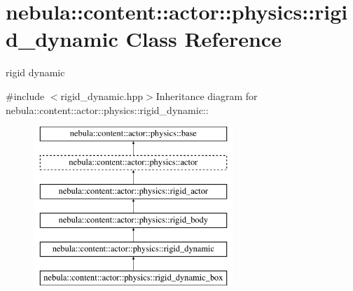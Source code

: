 \hypertarget{classnebula_1_1content_1_1actor_1_1physics_1_1rigid__dynamic}{
\section{nebula::content::actor::physics::rigid\_\-dynamic Class Reference}
\label{classnebula_1_1content_1_1actor_1_1physics_1_1rigid__dynamic}
}


rigid dynamic  


{\ttfamily \#include $<$rigid\_\-dynamic.hpp$>$}Inheritance diagram for nebula::content::actor::physics::rigid\_\-dynamic::\begin{figure}[H]
\begin{center}
\leavevmode
\includegraphics[height=6cm]{classnebula_1_1content_1_1actor_1_1physics_1_1rigid__dynamic}
\end{center}
\end{figure}
